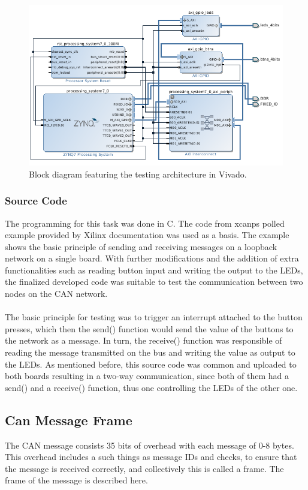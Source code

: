 \begin{figure}[h!]
	\centering
	\includegraphics[width = 0.9\linewidth]{graphics/Zybo_BasicTestingArchitecture_for_CAN.png}
	\caption{Block diagram featuring the testing architecture in Vivado.}
	\label{fig:CAN_Testing_Architecture}
\end{figure}

\subsubsection{Source Code}
The programming for this task was done in C.
The code from xcanps polled example provided by Xilinx documentation was used as a basis.
The example shows the basic principle of sending and receiving messages on a loopback network on a single board.
With further modifications and the addition of extra functionalities such as reading button input and writing the output to the LEDs, the finalized developed code was suitable to test the communication between two nodes on the CAN network.
\\\\
The basic principle for testing was to trigger an interrupt attached to the button presses, which then the send() function would send the value of the buttons to the network as a message.
In turn, the receive() function was responsible of reading the message transmitted on the bus and writing the value as output to the LEDs.
As mentioned before, this source code was common and uploaded to both boards resulting in a two-way communication, since both of them had a send() and a receive() function, thus one controlling the LEDs of the other one.


\subsection{Can Message Frame}\label{sub:CanMessageFrame}
The CAN message consists 35 bits of overhead with each message of 0-8 bytes. 
This overhead includes a such things as message IDs and checks, to ensure that the message is received correctly, and collectively this is called a frame. 
The frame of the message is described here.

